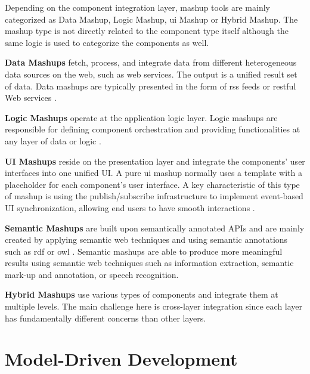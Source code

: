 Depending on the component integration layer,  mashup tools are mainly categorized as Data Mashup, Logic Mashup, \gls{ui} Mashup or Hybrid Mashup. The mashup type is not directly related to the component type itself although the same logic is used to categorize the components as well.


\textbf{Data Mashups} fetch, process, and integrate data from different
heterogeneous data sources on the web, such as web services. The output
is a unified result set of data. Data mashups are typically presented in
the form of \gls{rss} feeds or \gls{rest}ful Web services \autocite{Aghaee2014}.

\textbf{Logic Mashups} operate at the application logic layer. Logic
mashups are responsible for defining component orchestration and
providing functionalities at any layer of data or logic \autocite{Daniel2014a}.

\textbf{UI Mashups} reside on the presentation layer and integrate the
components' user interfaces into one unified UI. A pure \gls{ui} mashup
normally uses a template with a placeholder for each component's user
interface. A key characteristic of this type of mashup is using the
publish/subscribe infrastructure to implement event-based UI
synchronization, allowing end users to have smooth interactions \autocite{Soi2014a}.

\textbf{Semantic Mashups} are built upon semantically annotated APIs and
are mainly created by applying semantic web techniques and using
semantic annotations such as \gls{rdf} or \gls{owl} \autocite{Malki2012}.
Semantic mashups are able to produce more meaningful results using
semantic web techniques such as information extraction, semantic mark-up
and annotation, or speech recognition.

\textbf{Hybrid Mashups} use various types of components and integrate
them at multiple levels. The main challenge here is cross-layer
integration since each layer has fundamentally different concerns than
other layers.

\hypertarget{sec:mdd}{%
\section{Model-Driven Development}\label{sec:mdd}}

